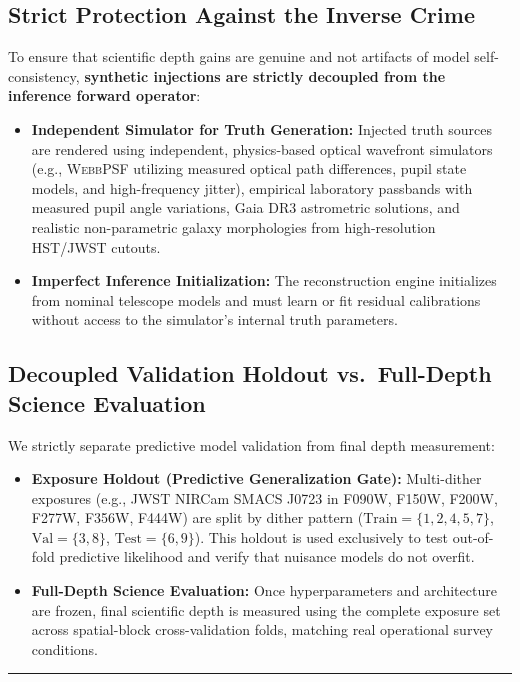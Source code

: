 \documentclass[11pt,a4paper]{article}
\begin{document}
\subsection{Strict Protection Against the Inverse Crime}
To ensure that scientific depth gains are genuine and not artifacts of model self-consistency, \textbf{synthetic injections are strictly decoupled from the inference forward operator}:
\begin{itemize}
    \item \textbf{Independent Simulator for Truth Generation:} Injected truth sources are rendered using independent, physics-based optical wavefront simulators (e.g., \textsc{WebbPSF} utilizing measured optical path differences, pupil state models, and high-frequency jitter), empirical laboratory passbands with measured pupil angle variations, Gaia DR3 astrometric solutions, and realistic non-parametric galaxy morphologies from high-resolution HST/JWST cutouts.
    \item \textbf{Imperfect Inference Initialization:} The reconstruction engine initializes from nominal telescope models and must learn or fit residual calibrations without access to the simulator's internal truth parameters.
\end{itemize}

\subsection{Decoupled Validation Holdout vs.\ Full-Depth Science Evaluation}
We strictly separate predictive model validation from final depth measurement:
\begin{itemize}
    \item \textbf{Exposure Holdout (Predictive Generalization Gate):} Multi-dither exposures (e.g., JWST NIRCam SMACS J0723 in F090W, F150W, F200W, F277W, F356W, F444W) are split by dither pattern ($\mathrm{Train} = \{1, 2, 4, 5, 7\}$, $\mathrm{Val} = \{3, 8\}$, $\mathrm{Test} = \{6, 9\}$). This holdout is used exclusively to test out-of-fold predictive likelihood and verify that nuisance models do not overfit.
    \item \textbf{Full-Depth Science Evaluation:} Once hyperparameters and architecture are frozen, final scientific depth is measured using the complete exposure set across spatial-block cross-validation folds, matching real operational survey conditions.
\end{itemize}

\vspace{1em}
\hrule
\vspace{1em}
\end{document}
